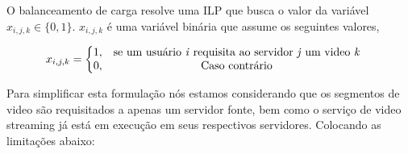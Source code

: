 %
%
%
 
O balanceamento de carga resolve uma ILP que busca o valor da variável $x_{i,j,k} \in \{0, 1\}$. $x_{i,j,k}$ é uma variável binária que assume os seguintes valores,

\vspace{0.5cm}
\begin{equation}\label{total_capacity_loss}
x_{i,j,k} =
\left\{\begin{matrix}
1, & \text{se um usuário \textit{i} requisita ao servidor \textit{j} um video \textit{k}}& \\ 
0, & \text{Caso contrário} & 
\end{matrix}\right.
\end{equation}
\vspace{0.5cm}

%


Para simplificar esta formulação nós estamos considerando que os segmentos de video são requisitados a apenas um servidor fonte, bem como o serviço de video streaming já está em execução em seus respectivos servidores. Colocando as limitações abaixo:%


\vspace{0.5cm}

